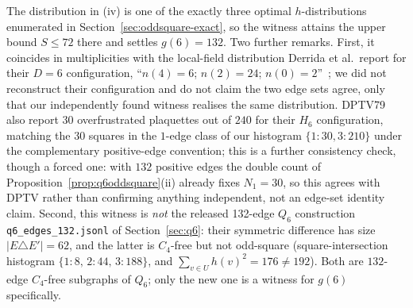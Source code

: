 \documentclass[12pt,a4paper]{article}
\theoremstyle{definition}
\begin{document}
The distribution in (iv) is one of the exactly three optimal
$h$-distributions enumerated in Section~\ref{sec:oddsquare-exact}, so
the witness attains the upper bound $S\le72$ there and settles
$g(6)=132$. Two further remarks. First, it coincides in multiplicities
with the local-field distribution Derrida et al.\ report for their
$D=6$ configuration, ``$n(4)=6$; $n(2)=24$; $n(0)=2$''~\cite[p.~622]{DPTV79};
we did not reconstruct their configuration and do not claim the two
edge sets agree, only that our independently found witness realises the
same distribution. DPTV79 also report $30$ overfrustrated plaquettes out of
$240$ for their $H_6$ configuration, matching the $30$ squares in the
$1$-edge class of our histogram $\{1{:}30,3{:}210\}$ under the complementary
positive-edge convention; this is a further consistency check, though a forced one: with $132$ positive edges the double count of Proposition~\ref{prop:q6oddsquare}(ii) already fixes $N_1=30$, so this agrees with DPTV rather than confirming anything independent, not an edge-set
identity claim. Second, this witness is \emph{not} the released
132-edge $Q_6$ construction \texttt{q6\_edges\_132.jsonl} of
Section~\ref{sec:q6}: their symmetric difference has size $|E\triangle E'|=62$, and the
latter is $C_4$-free but not odd-square (square-intersection histogram
$\{1\!:\!8,\,2\!:\!44,\,3\!:\!188\}$, and
$\sum_{v\in U}h(v)^2=176\ne192$). Both are $132$-edge $C_4$-free
subgraphs of $Q_6$; only the new one is a witness for $g(6)$
specifically.
\end{document}
